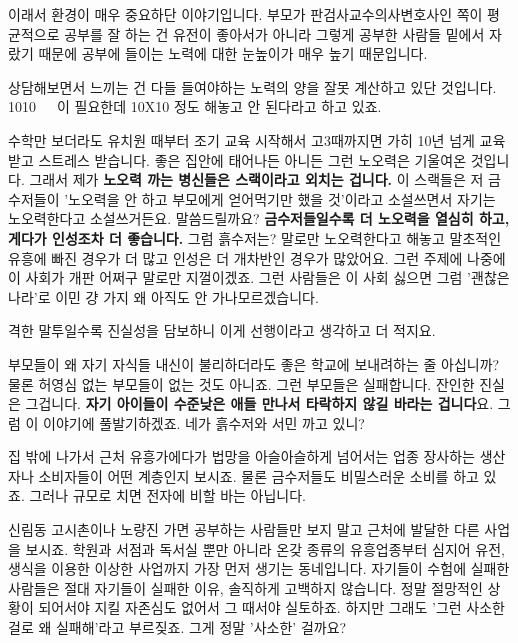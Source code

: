 이래서 환경이 매우 중요하단 이야기입니다.
부모가 판검사교수의사변호사인 쪽이 평균적으로 공부를 잘 하는 건 유전이 좋아서가 아니라
그렇게 공부한 사람들 밑에서 자랐기 때문에 공부에 들이는 노력에 대한 눈높이가 매우 높기 때문입니다.
\vspace{5mm}

상담해보면서 느끼는 건 다들 들여야하는 노력의 양을 잘못 계산하고 있단 것입니다.
1010   이 필요한데 10X10 정도 해놓고 안 된다라고 하고 있죠.
\vspace{5mm}

수학만 보더라도
유치원 때부터 조기 교육 시작해서 고3때까지면 가히 10년 넘게 교육받고 스트레스 받습니다.
좋은 집안에 태어나든 아니든 그런 노오력은 기울여온 것입니다.
그래서 제가 \textbf{노오력 까는 병신들은 스랙이라고 외치는 겁니다.}
이 스랙들은 저 금수저들이 '노오력을 안 하고 부모에게 얻어먹기만 했을 것'이라고 소설쓰면서 자기는 노오력한다고 소설쓰거든요.
말씀드릴까요?
\textbf{금수저들일수록 더 노오력을 열심히 하고, 게다가 인성조차 더 좋습니다.}
그럼 흙수저는? 말로만 노오력한다고 해놓고 말초적인 유흥에 빠진 경우가 더 많고 인성은 더 개차반인 경우가 많았어요.
그런 주제에 나중에 이 사회가 개판 어쩌구 말로만 지껄이겠죠.
그런 사람들은 이 사회 싫으면 그럼 '괜찮은 나라'로 이민 걍 가지 왜 아직도 안 가나모르겠습니다.
\vspace{5mm}

격한 말투일수록 진실성을 담보하니 이게 선행이라고 생각하고 더 적지요.
\vspace{5mm}

부모들이 왜 자기 자식들 내신이 불리하더라도 좋은 학교에 보내려하는 줄 아십니까?
물론 허영심 없는 부모들이 없는 것도 아니죠. 그런 부모들은 실패합니다.
잔인한 진실은 그겁니다. \textbf{자기 아이들이 수준낮은 애들 만나서 타락하지 않길 바라는 겁니다}요.
그럼 이 이야기에 풀발기하겠죠. 네가 흙수저와 서민 까고 있니?
\vspace{5mm}

집 밖에 나가서 근처 유흥가에다가 법망을 아슬아슬하게 넘어서는 업종 장사하는 생산자나 소비자들이 어떤 계층인지 보시죠.
물론 금수저들도 비밀스러운 소비를 하고 있죠. 그러나 규모로 치면 전자에 비할 바는 아닙니다.
\vspace{5mm}

신림동 고시촌이나 노량진 가면 공부하는 사람들만 보지 말고 근처에 발달한 다른 사업을 보시죠.
학원과 서점과 독서실 뿐만 아니라 온갖 종류의 유흥업종부터 심지어 유전, 생식을 이용한 이상한 사업까지 가장 먼저 생기는 동네입니다.
자기들이 수험에 실패한 사람들은 절대 자기들이 실패한 이유, 솔직하게 고백하지 않습니다.
정말 절망적인 상황이 되어서야 지킬 자존심도 없어서 그 때서야 실토하죠. 하지만 그래도 '그런 사소한 걸로 왜 실패해'라고 부르짖죠.
그게 정말 '사소한' 걸까요?
\vspace{5mm}

